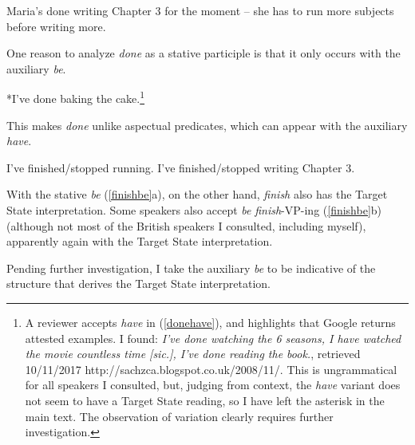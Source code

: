 \documentclass[output=paper,modfonts,nonflat]{langsci/langscibook}
\begin{document}
\begin{exe}
\ex\label{writeprog} Maria's done writing Chapter 3 for the moment -- she has to run more subjects before writing more.
\end{exe}

One reason to analyze \emph{done} as a stative participle is that it only
occurs with the auxiliary \emph{be}.

\begin{exe}
\ex\label{donehave} *I've done baking the cake.\footnote{A reviewer accepts \emph{have} in (\ref{donehave}), and highlights that Google returns attested examples. I found: \emph{I've done watching the 6 seasons, I have watched the movie countless time [sic.], I've done reading the book.}, retrieved 10/11/2017 http://sachzca.blogspot.co.uk/2008/11/. This is ungrammatical for all speakers I consulted, but, judging from context, the \emph{have} variant does not seem to have a Target State reading, so I have left the asterisk in the main text. The observation of variation clearly requires further investigation.}
\end{exe}

This makes \emph{done} unlike aspectual predicates, which can appear with the
auxiliary \emph{have}.

\begin{exe}
\ex\label{stop}
\begin{xlist}
\ex I've finished/stopped running.
\ex I've finished/stopped writing Chapter 3.
\end{xlist}
\end{exe}

With the stative \emph{be} (\ref{finishbe}a), on the other hand, \emph{finish}
also has the Target State interpretation. Some speakers also accept \emph{be}
\emph{finish}-VP-ing (\ref{finishbe}b) (although not most of the British
speakers I consulted, including myself), apparently again with the Target State
interpretation.

\begin{exe}
\ex\label{finishbe}
\begin{xlist}
\end{xlist}
\end{exe}

Pending further investigation, I take the auxiliary \emph{be} to be
indicative of the structure that derives the Target State interpretation.
\end{document}
